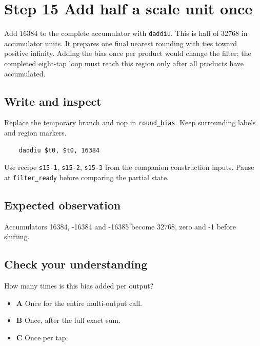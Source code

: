 \section{Step 15 Add half a scale unit once}\label{fir-s15}

Add 16384 to the complete accumulator with \texttt{daddiu}. This is half of 32768 in accumulator units. It prepares one final nearest rounding with ties toward positive infinity. Adding the bias once per product would change the filter; the completed eight-tap loop must reach this region only after all products have accumulated.

\subsection{Write and inspect}
Replace the temporary branch and nop in \texttt{round\_bias}. Keep surrounding labels and region markers.

\begin{verbatim}
    daddiu $t0, $t0, 16384
\end{verbatim}
Use recipe \texttt{s15-1}, \texttt{s15-2}, \texttt{s15-3} from the companion construction inputs. Pause at \texttt{filter\_ready} before comparing the partial state.

\subsection{Expected observation}
Accumulators 16384, -16384 and -16385 become 32768, zero and -1 before shifting.

\subsection{Check your understanding}
How many times is this bias added per output?

\begin{itemize}
\item \textbf{A} Once for the entire multi-output call.
\item \textbf{B} Once, after the full exact sum.
\item \textbf{C} Once per tap.
\end{itemize}
